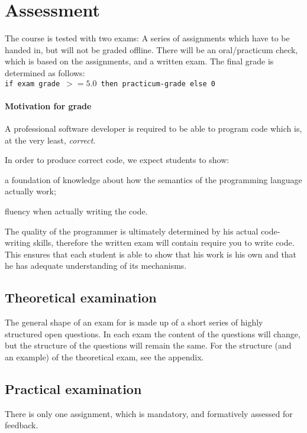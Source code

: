 \section{Assessment}
The course is tested with two exams:
A series of assignments which have to be handed in, but will not be graded offline. There will be an oral/practicum check, which is based on the assignments,
and a written exam. The final grade is determined as follows: \\

\texttt{if exam grade $ >= 5.0 $ then practicum-grade else 0}

\paragraph*{Motivation for grade}
A professional software developer is required to be able to program code which is, at the very least, \textit{correct}.

In order to produce correct code, we expect students to show:
\begin{inparaenum}
\item a foundation of knowledge about how the semantics of the programming language actually work;
\item fluency when actually writing the code.
\end{inparaenum}

The quality of the programmer is ultimately determined by his actual code-writing skills, therefore the written exam will contain require you to write code. This ensures that each student is able to show that his work is his own and that he has adequate understanding of its mechanisms.



\subsection{Theoretical examination \modulecode}
The general shape of an exam for \texttt{\modulecode} is made up of a short series of highly structured open questions.
In each exam the content of the questions will change, but the structure of the questions will remain the same.
For the structure (and an example) of the theoretical exam, see the appendix.


\subsection{Practical examination \modulecode}
There is only one assignment, which is mandatory, and formatively assessed for feedback.

